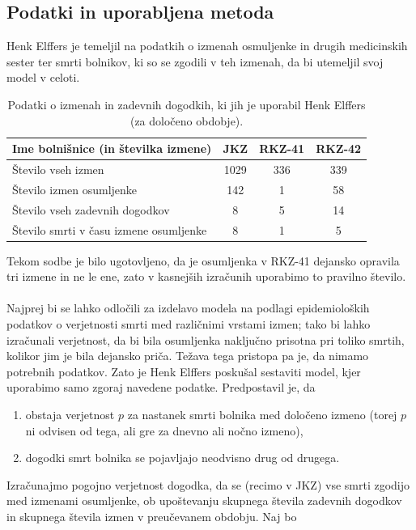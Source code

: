 \documentclass[fin1, tisk]{fmfdelo}
\theoremstyle{definition}
\theoremstyle{trditev}
\theoremstyle{izrek}
\begin{document}
\subsection{Podatki in uporabljena metoda}
Henk Elffers je temeljil na podatkih o izmenah osmuljenke in drugih medicinskih sester ter smrti bolnikov, ki so se zgodili v teh izmenah, da bi 
utemeljil svoj model v celoti.
\begin{table}[h!]
    \centering
    \caption{Podatki o izmenah in zadevnih dogodkih, ki jih je uporabil Henk Elffers (za določeno obdobje).}
    \label{table:1}
     \begin{tabular}{l c c c}
        \hline
        Ime bolnišnice (in številka izmene) & JKZ  & RKZ-41 & RKZ-42 \\ 
        \hline
        Število vseh izmen & 1029 & 336 & 339 \\
        Število izmen osumljenke & 142 & 1 & 58 \\
        Število vseh zadevnih dogodkov & 8 & 5 & 14 \\
        Število smrti v času izmene osumljenke & 8 & 1 & 5 \\
        \hline
     \end{tabular}
 \end{table}
Tekom sodbe je bilo ugotovljeno, da je osumljenka v RKZ-41 dejansko opravila tri izmene in ne le ene, zato v kasnejših izračunih uporabimo to 
pravilno število.\\\\
Najprej bi se lahko odločili za izdelavo modela na podlagi epidemioloških podatkov o verjetnosti smrti med različnimi vrstami izmen; 
tako bi lahko izračunali verjetnost, da bi bila osumljenka naključno prisotna pri toliko smrtih, kolikor jim je bila dejansko priča. Težava 
tega pristopa pa je, da nimamo potrebnih podatkov. Zato je Henk Elffers poskušal sestaviti model, kjer uporabimo samo zgoraj navedene podatke. Predpostavil 
je, da
\begin{enumerate}
    \item obstaja verjetnost $p$ za nastanek smrti bolnika med določeno izmeno (torej $p$ ni odvisen od tega, ali gre za dnevno ali nočno izmeno),
    \item dogodki smrt bolnika se pojavljajo neodvisno drug od drugega.
\end{enumerate}
Izračunajmo pogojno verjetnost dogodka, da se (recimo v JKZ) vse smrti zgodijo med izmenami osumljenke, ob upoštevanju skupnega števila 
zadevnih dogodkov in skupnega števila izmen v preučevanem obdobju. Naj bo\\
\end{document}
